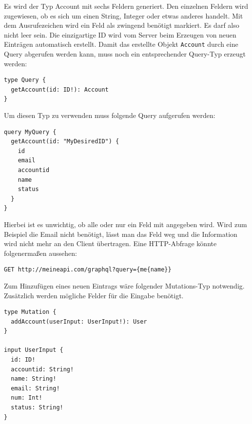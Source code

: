 Es wird der Typ Account mit sechs Feldern generiert.
Den einzelnen Feldern wird zugewiesen, ob es sich um einen String, Integer oder etwas anderes handelt.
Mit dem Ausrufezeichen wird ein Feld als zwingend benötigt markiert.
Es darf also nicht leer sein. Die einzigartige ID wird vom Server beim Erzeugen von neuen Einträgen automatisch erstellt.
Damit das erstellte Objekt \verb+Account+ durch eine Query abgerufen werden kann, muss noch ein entsprechender Query-Typ erzeugt werden:

\begin{lstlisting}[basicstyle=\ttfamily, breaklines=true , frame = single, backgroundcolor=\color{flashwhite} ]
type Query {
  getAccount(id: ID!): Account
}

\end{lstlisting}

Um diesen Typ zu verwenden muss folgende Query aufgerufen werden:

\begin{lstlisting}[basicstyle=\ttfamily, breaklines=true , frame = single, backgroundcolor=\color{flashwhite} ]
query MyQuery {
  getAccount(id: "MyDesiredID") {
    id
    email
    accountid
    name
    status
  }
}

\end{lstlisting}

Hierbei ist es unwichtig, ob alle oder nur ein Feld mit angegeben wird.
Wird zum Beispiel die Email nicht benötigt, lässt man das Feld weg und die Information wird nicht mehr an den Client übertragen.\cite[]{GraphQL1}
Eine HTTP-Abfrage könnte folgenermaßen aussehen\cite[]{GraphQLHTTP}:

\begin{lstlisting}[basicstyle=\ttfamily, breaklines=true , frame = single, backgroundcolor=\color{flashwhite} ]
GET http://meineapi.com/graphql?query={me{name}}

\end{lstlisting}


Zum Hinzufügen eines neuen Eintrags wäre folgender Mutations-Typ notwendig.
Zusätzlich werden mögliche Felder für die Eingabe benötigt.


\begin{lstlisting}[basicstyle=\ttfamily, breaklines=true , frame = single, backgroundcolor=\color{flashwhite} ]
type Mutation {
  addAccount(userInput: UserInput!): User
}

input UserInput {
  id: ID!
  accountid: String!
  name: String!
  email: String!
  num: Int!
  status: String!
}
\end{lstlisting}


